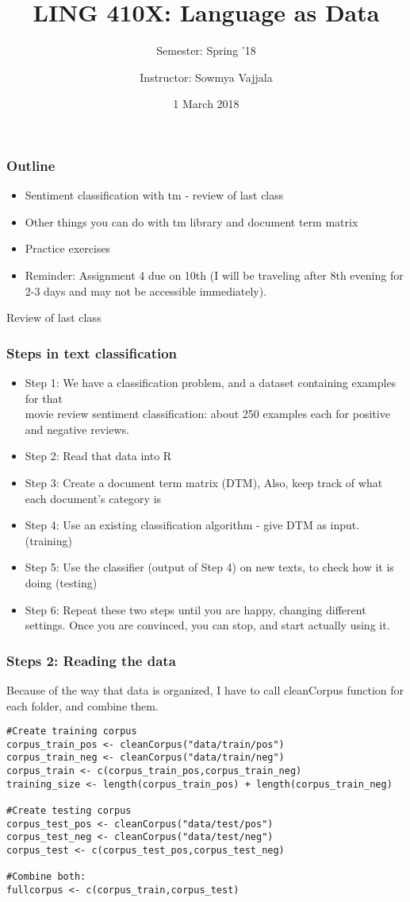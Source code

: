 \documentclass{beamer}
\author[Sowmya Vajjala]{Instructor: Sowmya Vajjala}
\title[LING 410X]{LING 410X: Language as Data}
\subtitle{Semester: Spring '18}
\date{1 March 2018}
\institute{Iowa State University, USA}
\begin{document}
\begin{frame}\titlepage
\end{frame}

\begin{frame}
\frametitle{Outline}
\begin{itemize}
\item Sentiment classification with tm - review of last class
\item Other things you can do with tm library and document term matrix
\item Practice exercises
\item Reminder: Assignment 4 due on 10th (I will be traveling after 8th evening for 2-3 days and may not be accessible immediately).
\end{itemize}
\end{frame}


\begin{frame}
\center
\Large Review of last class
\end{frame}

\begin{frame}
\frametitle{Steps in text classification}
\begin{itemize}
\item  Step 1: We have a classification problem, and a dataset containing examples for that
\\ movie review sentiment classification: about 250 examples each for positive and negative reviews. \pause
\item Step 2: Read that data into R 
\item Step 3: Create a document term matrix (DTM), Also, keep track of what each document's category is \pause
\item Step 4: Use an existing classification algorithm - give DTM as input. (training)
\item Step 5: Use the classifier (output of Step 4) on new texts, to check how it is doing (testing) \pause
\item Step 6: Repeat these two steps until you are happy, changing different settings. Once you are convinced, you can stop, and start actually using it.
\end{itemize}
\end{frame}

\begin{frame}[fragile]
\frametitle{Steps 2: Reading the data}
Because of the way that data is organized, I have to call cleanCorpus function for each folder, and combine them.
\footnotesize
\begin{verbatim}
#Create training corpus
corpus_train_pos <- cleanCorpus("data/train/pos")
corpus_train_neg <- cleanCorpus("data/train/neg") 
corpus_train <- c(corpus_train_pos,corpus_train_neg)
training_size <- length(corpus_train_pos) + length(corpus_train_neg)

#Create testing corpus
corpus_test_pos <- cleanCorpus("data/test/pos")
corpus_test_neg <- cleanCorpus("data/test/neg") 
corpus_test <- c(corpus_test_pos,corpus_test_neg) 

#Combine both:
fullcorpus <- c(corpus_train,corpus_test)
\end{verbatim}
\end{frame}
\end{document}

